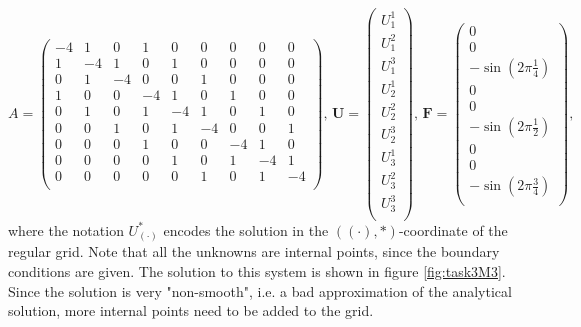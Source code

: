 \begin{equation*}
    A = \begin{pmatrix} 
    -4 & 1 & 0 & 1 & 0 & 0 & 0 & 0 & 0\\
    1 & -4 & 1 & 0 & 1 & 0 & 0 & 0 & 0 \\
    0 & 1 & -4 & 0 & 0 & 1 & 0 & 0 & 0\\
    1 & 0 & 0 & -4 & 1 & 0 & 1 & 0 & 0 \\
    0 & 1 & 0 & 1 & -4 & 1 & 0 & 1 & 0\\
    0 & 0 & 1 & 0 & 1 & -4 & 0 & 0 & 1\\
    0 & 0 & 0 & 1 & 0 & 0 & -4 & 1 & 0\\
    0 & 0 & 0 & 0 & 1 & 0 & 1 & -4 & 1 \\
    0 & 0 & 0 & 0 & 0 & 1 & 0 & 1 & -4\\
    \end{pmatrix}, \, 
    \boldsymbol{U} = \begin{pmatrix}
    U_1^1 \\
    U_1^2 \\
    U_1^3 \\
    U_2^1 \\
    U_2^2 \\
    U_2^3 \\
    U_3^1 \\
    U_3^2 \\
    U_3^3 \\
    \end{pmatrix}, \, \boldsymbol{F} = \begin{pmatrix}
    0 \\
    0 \\
    -\sin{(2\pi \frac14)} \\
    0 \\
    0 \\
    -\sin{(2\pi \frac12)} \\
    0 \\
    0 \\
    -\sin{(2\pi \frac34)} \\
    \end{pmatrix}, 
\end{equation*}
where the notation $U_{(\cdot)}^*$ encodes the solution in the $((\cdot), *)$-coordinate of the regular grid. Note that all the unknowns are internal points, since the boundary conditions are given. The solution to this system is shown in figure \ref{fig:task3M3}. Since the solution is very "non-smooth", i.e. a bad approximation of the analytical solution, more internal points need to be added to the grid. 

